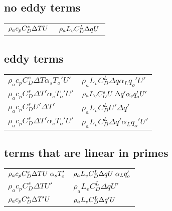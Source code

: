 \documentclass[12pt,a4paper]{article}
\newcommand{\Ub}{U\hspace*{1mm}}
\newcommand{\Up}{U'}
\newcommand{\Top}{T_o'}
\newcommand{\qop}{q_o'}
\newcommand{\CDs}{C_D^s}
\newcommand{\CDL}{C_D^L}
\begin{document}
\vspace*{-1cm}

\subsection*{no eddy terms}
\vspace*{-1cm}
\begin{table}[!h]
\centering
\begin{tabular}{ll}
$\rho_a c_p \CDs\Delta T\Ub$ & $\rho_a L_v \CDL\Delta q\Ub$
\end{tabular}
\end{table}

\vspace*{-1cm}

\subsection*{eddy terms}
\vspace*{-1cm}
\begin{table}[!h]
\centering
\begin{tabular}{ll}
$\rho_a c_p \CDs\Delta T \alpha_s \Top\Up$ & $\rho_a L_v \CDL\Delta q \alpha_L \qop\Up$\\ 
$\rho_a c_p \CDs\Delta T' \alpha_s \Top\Up$ & $\rho_a L_v \CDs\Ub\Delta q' \alpha_s \qop\Up$\\
$\rho_a c_p \CDs\Up\Delta T'$ & $\rho_a L_v \CDL\Up\Delta q'$ \\
$\rho_a c_p \CDs\Delta T' \alpha_s \Top\Up$ & $\rho_a L_v \CDL\Delta q' \alpha_L \qop\Up$
\end{tabular}
\end{table}

\vspace*{-1cm}

\subsection*{terms that are linear in primes}
\vspace*{-0.5cm}
\begin{table}[!h]
\centering
\begin{tabular}{ll}
$\rho_a c_p \CDs\Delta T\Ub \alpha_s \Top$ & $\rho_a L_v \CDL\Delta q\Ub \alpha_L \qop$\\ 
$\rho_a c_p \CDs\Delta T\Up $ & $\rho_a L_v \CDL\Delta q\Up $\\
$\rho_a c_p \CDs\Delta T' \Ub$ & $\rho_a L_v \CDL\Delta q' \Ub$ 
\end{tabular}
\end{table}
\end{document}
